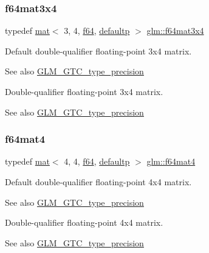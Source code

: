 \subsubsection{\texorpdfstring{f64mat3x4}{f64mat3x4}}
{\footnotesize\ttfamily typedef \hyperlink{structglm_1_1mat}{mat}$<$ 3, 4, \hyperlink{group__gtc__type__precision_ga2bba392e555124b36cde6abba349bab3}{f64}, \hyperlink{namespaceglm_a36ed105b07c7746804d7fdc7cc90ff25a9d21ccd8b5a009ec7eb7677befc3bf51}{defaultp} $>$ \hyperlink{group__gtc__type__precision_gaddb7f46e5a007c31348305de542e0d52}{glm\+::f64mat3x4}}

Default double-\/qualifier floating-\/point 3x4 matrix. \begin{DoxySeeAlso}{See also}
\hyperlink{group__gtc__type__precision}{G\+L\+M\+\_\+\+G\+T\+C\+\_\+type\+\_\+precision}
\end{DoxySeeAlso}
Double-\/qualifier floating-\/point 3x4 matrix. \begin{DoxySeeAlso}{See also}
\hyperlink{group__gtc__type__precision}{G\+L\+M\+\_\+\+G\+T\+C\+\_\+type\+\_\+precision} 
\end{DoxySeeAlso}
\mbox{\label{group__gtc__type__precision_ga9dfc41169318c3a9ca532e087c7641e9}} 
\subsubsection{\texorpdfstring{f64mat4}{f64mat4}}
{\footnotesize\ttfamily typedef \hyperlink{structglm_1_1mat}{mat}$<$ 4, 4, \hyperlink{group__gtc__type__precision_ga2bba392e555124b36cde6abba349bab3}{f64}, \hyperlink{namespaceglm_a36ed105b07c7746804d7fdc7cc90ff25a9d21ccd8b5a009ec7eb7677befc3bf51}{defaultp} $>$ \hyperlink{group__gtc__type__precision_ga9dfc41169318c3a9ca532e087c7641e9}{glm\+::f64mat4}}

Default double-\/qualifier floating-\/point 4x4 matrix. \begin{DoxySeeAlso}{See also}
\hyperlink{group__gtc__type__precision}{G\+L\+M\+\_\+\+G\+T\+C\+\_\+type\+\_\+precision}
\end{DoxySeeAlso}
Double-\/qualifier floating-\/point 4x4 matrix. \begin{DoxySeeAlso}{See also}
\hyperlink{group__gtc__type__precision}{G\+L\+M\+\_\+\+G\+T\+C\+\_\+type\+\_\+precision} 
\end{DoxySeeAlso}
\mbox{\label{group__gtc__type__precision_ga704001c2ed5838498ff61f55995fed3a}} 
